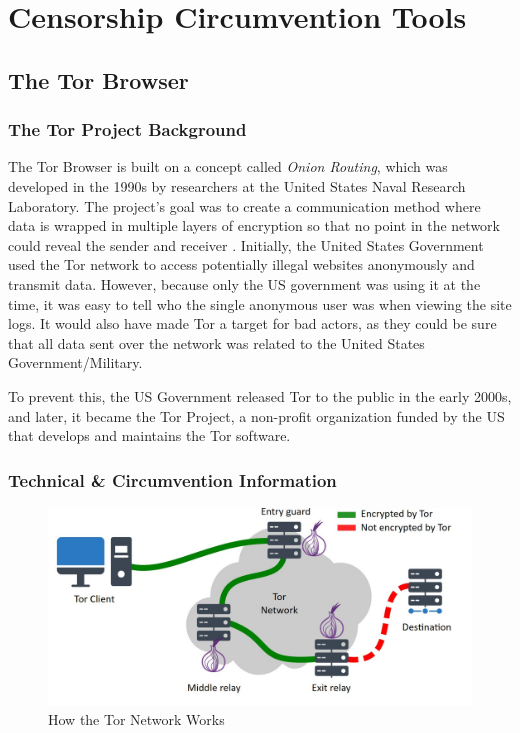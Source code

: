 \section{Censorship Circumvention Tools}

\subsection{The Tor Browser}

\subsubsection{The Tor Project Background}

The Tor Browser is built on a concept called \textit{Onion Routing}, which was developed in the 1990s by researchers at the United States Naval Research Laboratory. The project's goal was to create a communication method where data is wrapped in multiple layers of encryption so that no point in the network could reveal the sender and receiver \cite{torprojectProjectPrivacy}. Initially, the United States Government used the Tor network to access potentially illegal websites anonymously and transmit data. However, because only the US government was using it at the time, it was easy to tell who the single anonymous user was when viewing the site logs. It would also have made Tor a target for bad actors, as they could be sure that all data sent over the network was related to the United States Government/Military.

To prevent this, the US Government released Tor to the public in the early 2000s, and later, it became the Tor Project, a non-profit organization funded by the US that develops and maintains the Tor software. 

\subsubsection{Technical \& Circumvention Information}

\vspace{2em}

\begin{figure}[H]
    \centering
    \includegraphics[width=\textwidth]{Griff/TCD SCSS CAPSTONE/Literature Review/How tor works.jpg}
    \caption{How the Tor Network Works \cite{HowTorWorks}}
    \label{fig:iraq-middlebox-HTTP-manipulation}
\end{figure}

